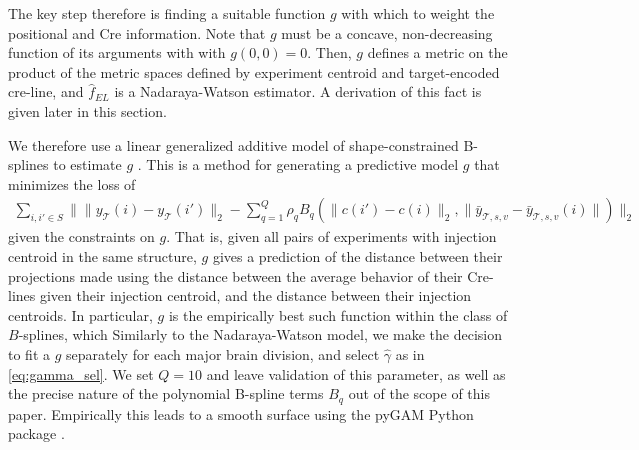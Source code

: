 The key step therefore is finding a suitable function $g$ with which to weight the positional and Cre information.
Note that $g$ must be a concave, non-decreasing function of its arguments with with $g(0,0) = 0$. Then, $g$ defines a metric on the product of the metric spaces defined by experiment centroid and target-encoded cre-line, and $\hat f_{EL}$ is a Nadaraya-Watson estimator. 
A derivation of this fact is given later in this section.

We therefore use a linear generalized additive model of shape-constrained  B-splines to estimate $g$ \citep{Eilers1996-ir}.
This is a method for generating a predictive model $g$ that minimizes the loss of
\begin{eqnarray*}
\sum_{i,i' \in S} \| \|y_{\mathcal T}(i) - y_{\mathcal T}(i')\|_2 - \sum_{q = 1}^Q  \rho_q B_q(\|c(i') - c(i)\|_2,  \| \bar y_{\mathcal T,s,v} -  \bar y_{\mathcal T,s,v}(i)\| )\|_2
\end{eqnarray*}
given the constraints on $g$.
That is, given all pairs of experiments with injection centroid in the same structure, $g$ gives a prediction of the distance between their projections made using the distance between the average behavior of their Cre-lines given their injection centroid, and the distance between their injection centroids.
In particular, $g$ is the empirically best such function within the class of $B$-splines, which 
Similarly to the Nadaraya-Watson model, we make the decision to fit a $g$ separately for each major brain division, and select $\hat \gamma$ as in \ref{eq:gamma_sel}.
We set $Q = 10$ and leave validation of this parameter, as well as the precise nature of the polynomial B-spline terms $B_q$ out of the scope of this paper.
Empirically this leads to a smooth surface using the pyGAM Python package \citep{Serven2018-aa}.

\newpage

